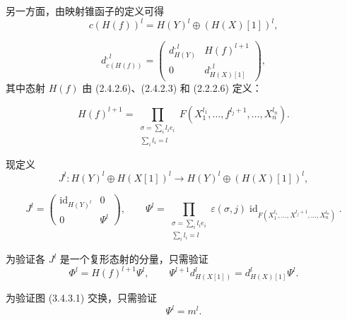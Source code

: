 \clearpage
{}%
\begingroup
\small
\setlength{\abovedisplayskip}{3pt plus 2pt minus 2pt}%
\setlength{\belowdisplayskip}{3pt plus 2pt minus 2pt}%
\setlength{\jot}{2pt}%

另一方面，由映射锥函子的定义可得
\[
  c(H(f))^l=H(Y)^l\oplus(H(X)[1])^l,
\]

\begin{equation}
  d_{c(H(f))}^{,l}=
  \begin{pmatrix}
    d_{H(Y)}^{,l} & H(f)^{l+1}\\
    0 & d_{H(X)[1]}^{,l}
  \end{pmatrix},
  \tag{3.4.3.4}
\end{equation}
其中态射 $H(f)$ 由 (2.4.2.6)、(2.4.2.3) 和 (2.2.2.6) 定义：

\begin{equation}
  H(f)^{l+1}=
  \prod_{\substack{\sigma=\sum_i l_i e_i\\ \sum_i l_i=l}}
  F(X_1^{l_1},\ldots,f^{l_j+1},\ldots,X_n^{l_n}).
  \tag{3.4.3.5}
\end{equation}

现定义
\[
  J^l\colon H(Y)^l\oplus H(X[1])^l
  \longrightarrow H(Y)^l\oplus(H(X)[1])^l,
\]

\begin{equation}
  J^l=
  \begin{pmatrix}
    \operatorname{id}_{H(Y)^l} & 0\\
    0 & \Psi^l
  \end{pmatrix},
  \qquad
  \Psi^l=
  \prod_{\substack{\sigma=\sum_i l_i e_i\\ \sum_i l_i=l}}
  \varepsilon(\sigma,j)
  \operatorname{id}_{F(X_1^{l_1},\ldots,X^{l_j+1},\ldots,X_n^{l_n})}.
  \tag{3.4.3.6}
\end{equation}

为验证各 $J^l$ 是一个复形态射的分量，只需验证
\begin{equation}
  \Phi^l=H(f)^{l+1}\Psi^l,
  \qquad
  \Psi^{l+1}d_{H(X[1])}^{l}=d_{H(X)[1]}^{l}\Psi^l.
  \tag{3.4.3.7}
\end{equation}

为验证图 (3.4.3.1) 交换，只需验证
\begin{equation}
  \Psi^l=m^l.
  \tag{3.4.3.8}
\end{equation}
\endgroup
